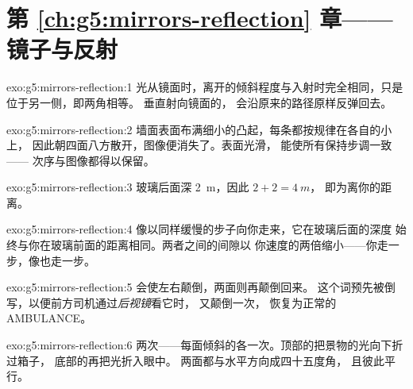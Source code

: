 \section*{第 \ref{ch:g5:mirrors-reflection} 章——镜子与反射}

\begin{solution}{exo:g5:mirrors-reflection:1}
光从镜面时，离开的倾斜程度与入射时完全相同，只是位于另一侧，即两角相等。
垂直射向镜面的，
会沿原来的路径原样反弹回去。
\end{solution}

\begin{solution}{exo:g5:mirrors-reflection:2}
墙面表面布满细小的凸起，每条都按规律在各自的小上，
因此朝四面八方散开，图像便消失了。表面光滑，
能使所有保持步调一致——
次序与图像都得以保留。
\end{solution}

\begin{solution}{exo:g5:mirrors-reflection:3}
玻璃后面深 \qty{2}{m}，因此 $2 + 2 = \qty{4}{m}$，
即为离你的距离。
\end{solution}

\begin{solution}{exo:g5:mirrors-reflection:4}
像以同样缓慢的步子向你走来，它在玻璃后面的深度
始终与你在玻璃前面的距离相同。两者之间的间隙以
你速度的两倍缩小——你走一步，像也走一步。
\end{solution}

\begin{solution}{exo:g5:mirrors-reflection:5}
会使左右颠倒，两面则再颠倒回来。
这个词预先被倒写，以便前方司机通过\emph{后视镜}看它时，
又颠倒一次，
恢复为正常的 AMBULANCE。
\end{solution}

\begin{solution}{exo:g5:mirrors-reflection:6}
两次——每面倾斜的各一次。顶部的把景物的光向下折过箱子，
底部的再把光折入眼中。
两面都与水平方向成四十五度角，
且彼此平行。
\end{solution}

